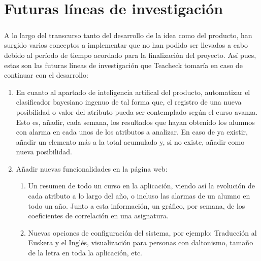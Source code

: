 \chapter{Futuras líneas de investigación}
\paragraph{}
A lo largo del transcurso tanto del desarrollo de la idea como del producto, han surgido varios conceptos a implementar que no han podido ser llevados a cabo debido al período de tiempo acordado para la finalización del proyecto. Así pues, estas son las futuras líneas de investigación que Teacheck tomaría en caso de continuar con el desarrollo:
\begin{enumerate}
\item En cuanto al apartado de inteligencia artifical del producto, automatizar el clasificador bayesiano ingenuo de tal forma que, el registro de una nueva posibilidad o valor del atributo pueda ser contemplado según el curso avanza. Esto es, añadir, cada semana, los resultados que hayan obtenido los alumnos con alarma en cada unos de los atributos a analizar. En caso de ya existir, añadir un elemento más a la total acumulado y, si no existe, añadir como nueva posibilidad.
\item Añadir nuevas funcionalidades en la página web:
\begin{enumerate}
\item Un resumen de todo un curso en la aplicación, viendo así la evolución de cada atributo a lo largo del año, o incluso las alarmas de un alumno en todo un año. Junto a esta información, un gráfico, por semana, de los coeficientes de correlación en una asignatura.
\item Nuevas opciones de configuración del sistema, por ejemplo: Traducción al Euskera y el Inglés, visualización para personas con daltonismo, tamaño de la letra en toda la aplicación, etc.
\end{enumerate}
\end{enumerate}
